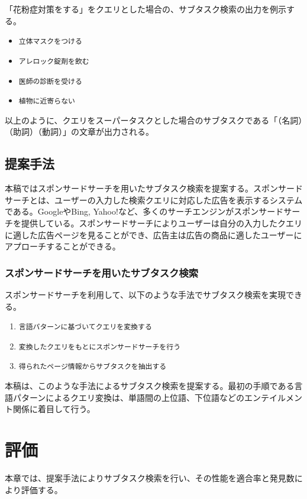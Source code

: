 \documentclass[submit,techreq]{ipsj}
\def\|{\verb|}
\begin{document}
「花粉症対策をする」をクエリとした場合の、サブタスク検索の出力を例示する。

\begin{itemize}
\item \|立体マスクをつける|
\item \|アレロック錠剤を飲む|
\item \|医師の診断を受ける|
\item \|植物に近寄らない|
\end{itemize}

以上のように、クエリをスーパータスクとした場合のサブタスクである「（名詞）（助詞）（動詞）」の文章が出力される。

\subsection{提案手法}
本稿ではスポンサードサーチを用いたサブタスク検索を提案する。スポンサードサーチとは、ユーザーの入力した検索クエリに対応した広告を表示するシステムである。GoogleやBing, Yahoo!など、多くのサーチエンジンがスポンサードサーチを提供している。スポンサードサーチによりユーザーは自分の入力したクエリに適した広告ページを見ることができ、広告主は広告の商品に適したユーザーにアプローチすることができる。


\subsubsection{スポンサードサーチを用いたサブタスク検索}
スポンサードサーチを利用して、以下のような手法でサブタスク検索を実現できる。

\begin{enumerate}
\item \|言語パターンに基づいてクエリを変換する|
\item \|変換したクエリをもとにスポンサードサーチを行う|
\item \|得られたページ情報からサブタスクを抽出する|
\end{enumerate}

本稿は、このような手法によるサブタスク検索を提案する。最初の手順である言語パターンによるクエリ変換は、単語間の上位語、下位語などのエンテイルメント関係に着目して行う。


\section{評価}
本章では、提案手法によりサブタスク検索を行い、その性能を適合率と発見数により評価する。

\end{document}
